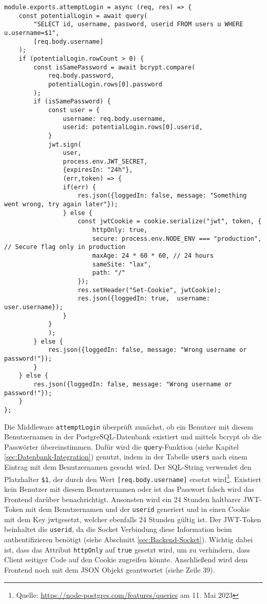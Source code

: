 \begin{lstlisting}[style=codeStyle, caption={Die attemptLogin Middleware zum Anmelden}, label={lst:attemptLogin}]
module.exports.attemptLogin = async (req, res) => {
    const potentialLogin = await query(
        "SELECT id, username, password, userid FROM users u WHERE u.username=$1",
        [req.body.username]
    );
    if (potentialLogin.rowCount > 0) {
        const isSamePassword = await bcrypt.compare(
            req.body.password,
            potentialLogin.rows[0].password
        );
        if (isSamePassword) {
            const user = {
                username: req.body.username,
                userid: potentialLogin.rows[0].userid,
            }
            jwt.sign(
                user,
                process.env.JWT_SECRET,
                {expiresIn: "24h"},
                (err,token) => {
                if(err) {
                    res.json({loggedIn: false, message: "Something went wrong, try again later"});
                } else {
                    const jwtCookie = cookie.serialize("jwt", token, {
                        httpOnly: true,
                        secure: process.env.NODE_ENV === "production", // Secure flag only in production
                        maxAge: 24 * 60 * 60, // 24 hours
                        sameSite: "lax",
                        path: "/"
                    });
                    res.setHeader("Set-Cookie", jwtCookie);
                    res.json({loggedIn: true,  username: user.username});
                }
            }
            );
        } else {
            res.json({loggedIn: false, message: "Wrong username or password!"});
        }
    } else {
        res.json({loggedIn: false, message: "Wrong username or password!"});
    }
};
\end{lstlisting}

Die Middleware \verb|attemptLogin| überprüft zunächst, ob ein Benutzer mit diesem Benutzernamen in der PostgreSQL-Datenbank existiert und mittels bcrypt ob die Passwörter übereinstimmen. Dafür wird die \verb|query|-Funktion (siehe Kapitel \ref{sec:Datenbank-Integration}) genutzt, indem in der Tabelle \verb|users| nach einem Eintrag mit dem Benutzernamen gesucht wird. Der SQL-String verwendet den Platzhalter \verb|$1|, der durch den Wert \verb|[req.body.username]| ersetzt wird\footnote{Quelle: \url{https://node-postgres.com/features/queries} am 11. Mai 2023}. Existiert kein Benutzer mit diesem Benutzernamen oder ist das Passwort falsch wird das Frontend darüber benachrichtigt. Ansonsten wird ein 24 Stunden haltbarer JWT-Token mit dem Benutzernamen und der \verb|userid| generiert und in einen Cookie mit dem Key \glqq jwt\grqq{ }gesetzt, welcher ebenfalls 24 Stunden gültig ist. Der JWT-Token beinhaltet die \verb|userid|, da die Socket Verbindung diese Information beim authentifizieren benötigt (siehe Abschnitt \ref{sec:Backend-Socket}).  Wichtig dabei ist, dass das Attribut \verb|httpOnly| auf \verb|true| gesetzt wird, um zu verhindern, dass Client seitiger Code auf den Cookie zugreifen könnte. Anschließend wird dem Frontend noch mit dem JSON Objekt geantwortet (siehe Zeile 39).

